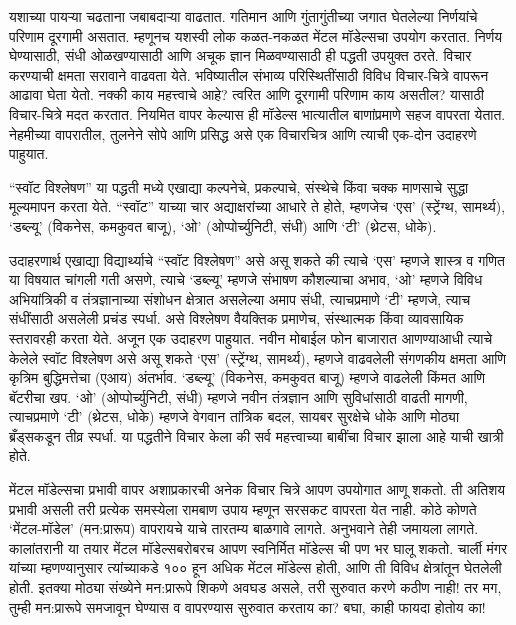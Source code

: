 यशाच्या पायऱ्या चढताना जबाबदाऱ्या वाढतात. गतिमान आणि गुंतागुंतीच्या जगात घेतलेल्या निर्णयांचे परिणाम दूरगामी असतात. म्हणूनच यशस्वी लोक कळत-नकळत मेंटल मॉडेल्सचा उपयोग करतात. निर्णय घेण्यासाठी, संधी ओळखण्यासाठी आणि अचूक ज्ञान मिळवण्यासाठी ही पद्धती उपयुक्त ठरते. विचार करण्याची क्षमता सरावाने वाढवता येते. भविष्यातील संभाव्य परिस्थितींसाठी विविध विचार-चित्रे वापरून आढावा घेता येतो. नक्की काय महत्त्वाचे आहे? त्वरित आणि दूरगामी परिणाम काय असतील? यासाठी विचार-चित्रे मदत करतात. नियमित वापर केल्यास ही मॉडेल्स भात्यातील बाणांप्रमाणे सहज वापरता येतात. नेहमीच्या वापरातील, तुलनेने सोपे आणि प्रसिद्ध असे एक विचारचित्र आणि त्याची एक-दोन उदाहरणे पाहुयात. 

“स्वॉट विश्लेषण” 
या पद्धती मध्ये एखाद्या कल्पनेचे, प्रकल्पाचे, संस्थेचे किंवा चक्क माणसाचे सुद्धा मूल्यमापन करता येते. “स्वॉट” याच्या चार अद्याक्षरांच्या आधारे ते होते, म्हणजेच ‘एस’ (स्ट्रेंग्थ, सामर्थ्य), ‘डब्ल्यू’ (विकनेस, कमकुवत बाजू), ‘ओ’ (ओप्पोर्च्युनिटी, संधी) आणि ‘टी’ (थ्रेटस, धोके). 

उदाहरणार्थ एखाद्या विद्यार्थ्याचे “स्वॉट विश्लेषण” असे असू शकते की त्याचे ‘एस’ म्हणजे शास्त्र व गणित या विषयात चांगली गती असणे, त्याचे ‘डब्ल्यू’ म्हणजे संभाषण कौशल्याचा अभाव, ‘ओ’ म्हणजे विविध अभियांत्रिकी व तंत्रज्ञानाच्या संशोधन क्षेत्रात असलेल्या अमाप संधी, त्याचप्रमाणे ‘टी’ म्हणजे, त्याच संधींसाठी असलेली प्रचंड स्पर्धा. असे विश्लेषण वैयक्तिक प्रमाणेच, संस्थात्मक किंवा व्यावसायिक स्तरावरही करता येते. अजून एक उदाहरण पाहुयात. नवीन मोबाईल फोन बाजारात आणण्याआधी त्याचे केलेले स्वॉट विश्लेषण असे असू शकते  ‘एस’ (स्ट्रेंग्थ, सामर्थ्य), म्हणजे वाढवलेली संगणकीय क्षमता आणि कृत्रिम बुद्धिमत्तेचा (एआय) अंतर्भाव.  ‘डब्ल्यू’ (विकनेस, कमकुवत बाजू) म्हणजे वाढलेली किंमत आणि बॅटरीचा खप. ‘ओ’ (ओप्पोर्च्युनिटी, संधी)  म्हणजे नवीन तंत्रज्ञान आणि सुविधांसाठी वाढती मागणी, त्याचप्रमाणे  ‘टी’ (थ्रेटस, धोके) म्हणजे  वेगवान तांत्रिक बदल, सायबर सुरक्षेचे धोके आणि मोठ्या ब्रँड्सकडून तीव्र स्पर्धा. या पद्धतीने विचार केला की सर्व महत्त्वाच्या बाबींचा विचार झाला आहे याची खात्री होते.

मेंटल मॉडेल्सचा प्रभावी वापर
अशाप्रकारची अनेक विचार चित्रे आपण उपयोगात आणू शकतो. ती अतिशय प्रभावी असली तरी प्रत्येक समस्येला रामबाण उपाय म्हणून सरसकट वापरता येत नाही. कोठे कोणते ‘मेंटल-मॉडेल’ (मन:प्रारूप) वापरायचे याचे तारतम्य बाळगावे लागते. अनुभवाने तेही जमायला लागते. कालांतरानी या तयार मेंटल मॉडेल्सबरोबरच आपण स्वनिर्मित मॉडेल्स ची पण भर घालू शकतो. चार्ली मंगर यांच्या म्हणण्यानुसार त्यांच्याकडे १०० हून अधिक मेंटल मॉडेल्स होती, आणि ती विविध क्षेत्रांतून घेतलेली होती. इतक्या मोठ्या संख्येने मन:प्रारूपे शिकणे अवघड असले, तरी सुरुवात करणे कठीण नाही! तर मग, तुम्ही मन:प्रारूपे समजावून घेण्यास व वापरण्यास सुरुवात करताय का? बघा, काही फायदा होतोय का!

